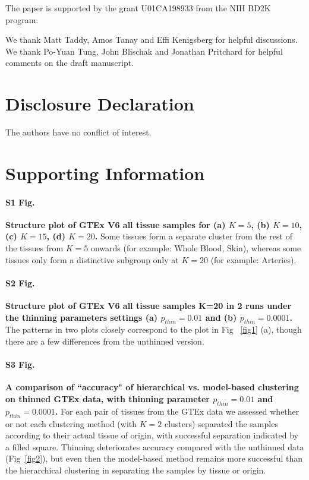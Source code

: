 \documentclass[10pt,letterpaper]{article}
\begin{document}
The paper is supported by the grant U01CA198933 from the NIH BD2K program.

We thank Matt Taddy, Amos Tanay and Effi Kenigsberg for helpful discussions. We thank Po-Yuan Tung, John Blischak and Jonathan Pritchard for helpful comments on the draft manuscript.

\section*{Disclosure Declaration}

The authors have no conflict of interest.

\nolinenumbers



\section*{Supporting Information}
\paragraph*{S1 Fig.}
\label{figS1}
{\bf Structure plot of GTEx V6 all tissue samples for (a) $K=5$, (b) $K=10$, (c) $K=15$, (d) $K=20$.} Some tissues form a separate cluster from the rest of the tissues from $K=5$ onwards (for example: Whole Blood, Skin), whereas some tissues only form a distinctive subgroup only at $K=20$ (for example: Arteries).

\paragraph*{S2 Fig.}
\label{figS2}
{\bf Structure plot of GTEx V6 all tissue samples K=20 in 2 runs under the thinning parameters settings (a) $p_{thin}=0.01$ and (b) $p_{thin}=0.0001$.} The patterns in two plots closely correspond to the plot in Fig ~\ref{fig1} (a), though there are a few differences from the unthinned version.

\paragraph*{S3 Fig.}
\label{figS3}
{\bf A comparison of ``accuracy" of hierarchical vs. model-based clustering on thinned GTEx data, with thinning parameter $p_{thin}=0.01$ and $p_{thin}=0.0001$.}  For each pair of tissues from the GTEx data we assessed whether or not each clustering method (with $K=2$ clusters) separated the samples according to their actual tissue of origin, with successful separation indicated by a filled square. Thinning deteriorates accuracy compared with the unthinned data (Fig~\ref{fig2}), but even then the model-based method remains more successful than the hierarchical clustering in separating the samples by tissue or origin.
\end{document}

